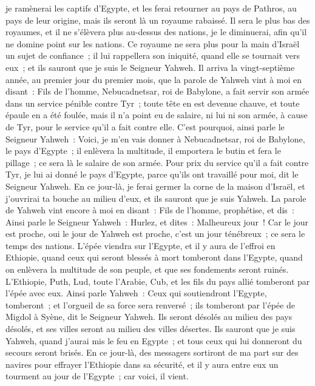 \begin{multicols}{2}
je ramènerai les captifs d'Egypte, et les ferai retourner au pays de Pathros, au pays de leur origine, mais ils seront là un royaume rabaissé.
Il sera le plus bas des royaumes, et il ne s'élèvera plus au-dessus des nations, je le diminuerai, afin qu'il ne domine point sur les nations.
Ce royaume ne sera plus pour la main d'Israël un sujet de confiance~; il lui rappellera son iniquité, quand elle se tournait vers eux~; et ils sauront que je suis le Seigneur Yahweh.
Il arriva la vingt-septième année, au premier jour du premier mois, que la parole de Yahweh vint à moi en disant~:
Fils de l'homme, Nebucadnetsar, roi de Babylone, a fait servir son armée dans un service pénible contre Tyr~; toute tête en est devenue chauve, et toute épaule en a été foulée, mais il n'a point eu de salaire, ni lui ni son armée, à cause de Tyr, pour le service qu'il a fait contre elle.
C'est pourquoi, ainsi parle le Seigneur Yahweh~: Voici, je m'en vais donner à Nebucadnetsar, roi de Babylone, le pays d'Egypte~; il enlèvera la multitude, il emportera le butin et fera le pillage~; ce sera là le salaire de son armée.
Pour prix du service qu'il a fait contre Tyr, je lui ai donné le pays d'Egypte, parce qu'ils ont travaillé pour moi, dit le Seigneur Yahweh.
En ce jour-là, je ferai germer la corne de la maison d'Israël, et j'ouvrirai ta bouche au milieu d'eux, et ils sauront que je suis Yahweh.
\VerseOne{}La parole de Yahweh vint encore à moi en disant~:
Fils de l'homme, prophétise, et dis~: Ainsi parle le Seigneur Yahweh~: Hurlez, et dites~: Malheureux jour~!
Car le jour est proche, oui le jour de Yahweh est proche, c'est un jour ténébreux~; ce sera le temps des nations.
L'épée viendra sur l'Egypte, et il y aura de l'effroi en Ethiopie, quand ceux qui seront blessés à mort tomberont dans l'Egypte, quand on enlèvera la multitude de son peuple, et que ses fondements seront ruinés.
L'Ethiopie, Puth, Lud, toute l'Arabie, Cub, et les fils du pays allié tomberont par l'épée avec eux.
Ainsi parle Yahweh~: Ceux qui soutiendront l'Egypte, tomberont~; et l'orgueil de sa force sera renversé~; ils tomberont par l'épée de Migdol à Syène, dit le Seigneur Yahweh.
Ils seront désolés au milieu des pays désolés, et ses villes seront au milieu des villes désertes.
Ils sauront que je suis Yahweh, quand j'aurai mis le feu en Egypte~; et tous ceux qui lui donneront du secours seront brisés.
En ce jour-là, des messagers sortiront de ma part sur des navires pour effrayer l'Ethiopie dans sa sécurité, et il y aura entre eux un tourment au jour de l'Egypte~; car voici, il vient.

\end{multicols}
